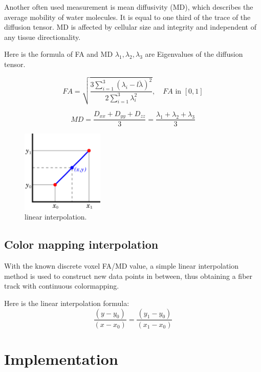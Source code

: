 \documentclass[hyperref, plainreport, noproblem]{cgvpub1}
\begin{document}
Another often used measurement is mean diffusivity (MD), which describes the average mobility of water molecules. It is equal to one third of the trace of the diffusion tensor. MD is affected by cellular size and integrity and independent of any tissue directionality. \cite{cer}

Here is the formula of FA and MD $\lambda_1, \lambda_2, \lambda_3$  are Eigenvalues of the diffusion tensor.

\begin{equation}
	FA=\sqrt{\frac{3 \sum_{i=1}^{3}(\lambda_i-\bar{l\lambda})^2}{2\sum_{i=1}^3\lambda_i^2}}, \quad FA\text{ in } [0,1]
\end{equation}

\begin{equation}
	MD=\frac{D_{xx}+D_{yy}+D_{zz}}{3}= \frac{\lambda_1+\lambda_2+\lambda_3}{3}
\end{equation}

\begin{figure}[h]
	\centering
	\includegraphics[width=0.35\textwidth]{interp}
	\caption{ linear interpolation.}
	\label{fig:interp}
\end{figure}



\section{ Color mapping interpolation }
With the known discrete voxel FA/MD value, a simple linear interpolation method is used to construct new data points in between, thus obtaining a fiber track with continuous colormapping.



Here is the linear interpolation formula:
\begin{equation}
 \frac{(y-y_0)}{(x-x_0)} = \frac{(y_1-y_0)}{(x_1-x_0)}
\end{equation}


\chapter{Implementation}
\end{document}
